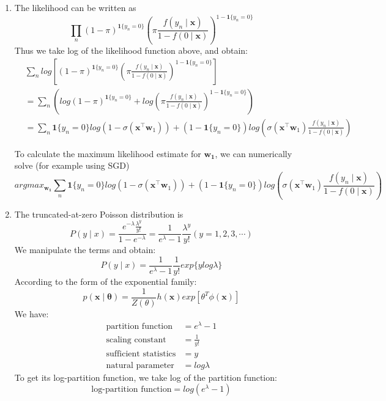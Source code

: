 \begin{enumerate}
\item The likelihood can be written as
\[
\prod_{n} (1-\pi)^{\mathbf{1}\{y_{n} = 0\}}(\pi\frac{f(y_{n}\mid \mathbf{x})}{1 - f(0\mid \mathbf{x})})^{1-\mathbf{1}\{y_{n} = 0\}}
\]
Thus we take log of the likelihood function above, and obtain:
\begin{align}
	& \sum_{n}log[(1-\pi)^{\mathbf{1}\{y_{n} = 0\}}(\pi\frac{f(y_{n}\mid \mathbf{x})}{1 - f(0\mid \mathbf{x})})^{1-\mathbf{1}\{y_{n} = 0\}}] \nonumber \\
	& = \sum_{n}(log(1-\pi)^{\mathbf{1}\{y_{n} = 0\}} + log(\pi\frac{f(y_{n}\mid \mathbf{x})}{1 - f(0\mid \mathbf{x})})^{1-\mathbf{1}\{y_{n} = 0\}}) \nonumber \\
	& = \sum_{n}\mathbf{1}\{y_{n} = 0\}log(1-\sigma(\mathbf{x}^\top\mathbf{w}_{1})) + (1-\mathbf{1}\{y_{n} = 0\})log(\sigma(\mathbf{x}^\top\mathbf{w}_{1})\frac{f(y_n\mid \mathbf{x})}{1 - f(0\mid \mathbf{x})})\nonumber
\end{align}

To calculate the maximum likelihood estimate for $\mathbf{w_{1}}$, we can numerically solve (for example using SGD)
\[
argmax_{\mathbf{w_1}}\sum_{n}\mathbf{1}\{y_{n} = 0\}log(1-\sigma(\mathbf{x}^\top\mathbf{w}_{1})) + (1-\mathbf{1}\{y_{n} = 0\})log(\sigma(\mathbf{x}^\top\mathbf{w}_{1})\frac{f(y_n\mid \mathbf{x})}{1 - f(0\mid \mathbf{x})}) 
\]

\item The truncated-at-zero Poisson distribution is
\[
P(y \mid x) = \frac{e^{-\lambda}\frac{\lambda^y}{y!}}{1-e^{-\lambda}} = \frac{1}{e^\lambda - 1}\frac{\lambda^y}{y!} (y = 1, 2, 3, \cdots)
\]
We manipulate the terms and obtain:
\[
P(y \mid x) = \frac{1}{e^\lambda - 1} \frac{1}{y!}exp\{ylog\lambda\}
\]
According to the form of the exponential family:
\[
p(\mathbf{x}\mid\mathbf{\theta}) = \frac{1}{Z(\theta)}h(\mathbf{x})exp[\theta^T\phi(\mathbf{x})]
\]
We have:
\begin{align}
\text{partition function} & = e^\lambda - 1 \nonumber \\
\text{scaling constant} &= \frac{1}{y!} \nonumber \\
\text{sufficient statistics} &= y \nonumber \\
\text{natural parameter} & = log\lambda \nonumber
\end{align}
To get its log-partition function, we take log of the partition function:
\[
\text{log-partition function} = log(e^\lambda - 1)
\]


\end{enumerate}
